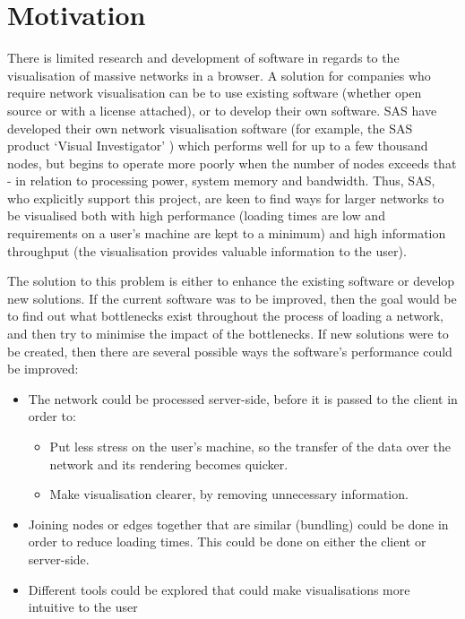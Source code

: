 \documentclass[../dissertation.tex]{subfiles}
\begin{document}
\chapter{Motivation}
\label{chap:motiv}

There is limited research and development of software in regards to the visualisation of massive networks in a browser. A solution for companies who require network visualisation can be to use existing software (whether open source or with a license attached), or to develop their own software. SAS have developed their own network visualisation software (for example, the SAS product `Visual Investigator' \cite{sasvi}) which performs well for up to a few thousand nodes, but begins to operate more poorly when the number of nodes exceeds that - in relation to processing power, system memory and bandwidth. Thus, SAS, who explicitly support this project, are keen to find ways for larger networks to be visualised both with high performance (loading times are low and requirements on a user's machine are kept to a minimum) and high information throughput (the visualisation provides valuable information to the user).

The solution to this problem is either to enhance the existing software or develop new solutions. If the current software was to be improved, then the goal would be to find out what bottlenecks exist throughout the process of loading a network, and then try to minimise the impact of the bottlenecks. If new solutions were to be created, then there are several possible ways the software's performance could be improved:

\begin{itemize}
	\item The network could be processed server-side, before it is passed to the client in order to:
	\begin{itemize}
	    \item Put less stress on the user's machine, so the transfer of the data over the network and its rendering becomes quicker.
	    \item Make visualisation clearer, by removing unnecessary information.
	\end{itemize}
	\item Joining nodes or edges together that are similar (bundling) could be done in order to reduce loading times. This could be done on either the client or server-side.
	\item Different tools could be explored that could make visualisations more intuitive to the user
\end{itemize}
\end{document}
